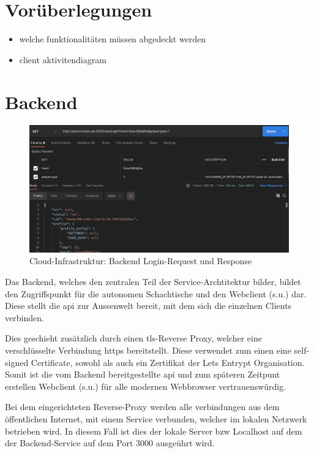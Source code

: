 \hypertarget{voruxfcberlegungen}{%
\section{Vorüberlegungen}\label{voruxfcberlegungen}}

\begin{itemize}
\tightlist
\item
  welche funktionalitäten müssen abgedeckt werden
\item
  client aktivitendiagram
\end{itemize}

\hypertarget{backend}{%
\section{Backend}\label{backend}}

\begin{figure}
\centering
\includegraphics{images/ATC_request_example.png}
\caption{Cloud-Infrastruktur: Backend Login-Request und Response
\label{ATC_request_example}}
\end{figure}

Das Backend, welches den zentralen Teil der Service-Archtitektur bilder,
bildet den Zugriffspunkt für die autonomen Schachtische und den
Webclient (s.u.) dar. Diese stellt die \gls{api} zur Aussenwelt bereit,
mit dem sich die einzelnen Clients verbinden.

Dies geschieht zusätzlich durch einen \gls{tls}-Reverse Proxy, welcher
eine verschlüsselte Verbindung \gls{https} bereitstellt. Diese verwendet
zum einen eine self-signed Certificate, sowohl als auch ein Zertifikat
der Lets Entrypt Organisation\cite{letsencrpyt}. Somit ist die vom
Backend bereitgestellte \gls{api} und zum späteren Zeitpunt erstellen
Webclient (s.u.) für alle modernen Webbrowser vertrauenswürdig.

Bei dem eingerichteten Reverse-Proxy werden alle verbindungen aus dem
öffentlichen Internet, mit einem Service verbunden, welcher im lokalen
Netzwerk betrieben wird. In diesem Fall ist dies der lokale Server bzw
Localhost auf dem der Backend-Service auf dem Port 3000 ausgeührt wird.

